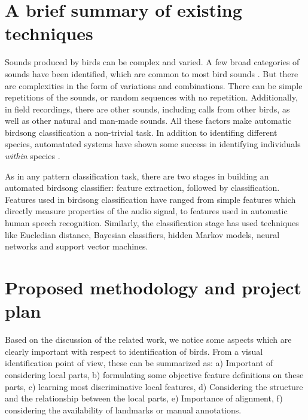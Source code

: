 \documentclass{article}
\begin{document}
\section*{A brief summary of existing techniques}

Sounds produced by birds can be complex and varied. A few broad categories of
sounds have been identified, which are common to most bird sounds
\cite{brandes_automatedSoundRecording2008}. But there are complexities in the
form of variations and combinations. There can be simple repetitions of the
sounds, or random sequences with no repetition.  Additionally, in field
recordings, there are other sounds, including calls from other birds, as well as
other natural and man-made sounds. All these factors make automatic birdsong
classification a non-trivial task. In addition to identifing different species,
automatated systems have shown some success in identifying individuals
\emph{within} species \cite{kirschel_territorial2011}.

As in any pattern classification task, there are two stages in building an
automated birdsong classifier: feature extraction, followed by classification.
Features used in birdsong classification have ranged from simple features which
directly measure properties of the audio signal, to features used in automatic
human speech recognition. Similarly, the classification stage has used
techniques like Eucledian distance, Bayesian classifiers, hidden Markov models, neural networks and support vector machines.



\section{Proposed methodology and project plan}

Based on the discussion of the related work, we notice some aspects which are clearly important with respect to identification of birds. From a visual identification point of view, these can be summarized as: a) Important of considering local parts, b) formulating some objective feature definitions on these parts, c) learning most discriminative local features, d) Considering the structure and the relationship between the local parts, e) Importance of alignment, f) considering the availability of landmarks or manual annotations. 
\end{document}
